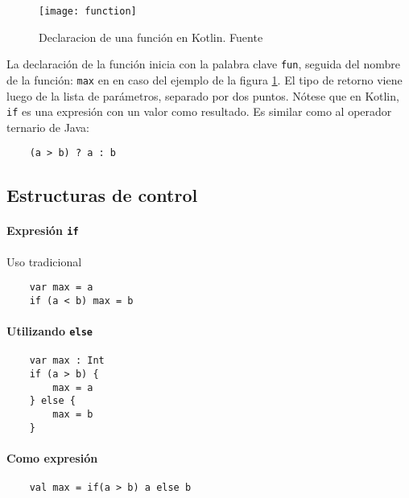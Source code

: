 \begin{figure}[h!]
  \texttt{[image: function]}
  \caption{Declaracion de una función en Kotlin. Fuente \cite{kotlin-in-action}}
  \label{fig:kotlin-function-declaration}
\end{figure} 

La declaración de la función inicia con la palabra clave \texttt{fun}, seguida del nombre de la función: \texttt{max} en en caso del ejemplo de la figura \ref{fig:kotlin-function-declaration}. El tipo de retorno viene luego de la lista de parámetros, separado por dos puntos. Nótese que en Kotlin, \texttt{if} es una expresión con un valor como resultado. Es similar como al operador ternario de Java: 
\begin{verbatim}
    (a > b) ? a : b
\end{verbatim}


\subsection{Estructuras de control}

\paragraph{Expresión \texttt{if}}
Uso tradicional
\begin{verbatim}
    var max = a
    if (a < b) max = b
\end{verbatim}

\paragraph{Utilizando \texttt{else}}
\begin{verbatim}
    var max : Int
    if (a > b) {
        max = a
    } else {
        max = b
    }
\end{verbatim}

\paragraph{Como expresión}
\begin{verbatim}
    val max = if(a > b) a else b
\end{verbatim}




